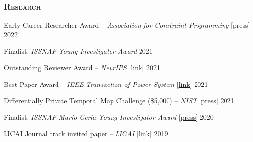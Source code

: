 


\subsubsection*{{\bf \scshape Research}}
\beginList
\item
	Early Career Researcher Award -- \emph{Association for Constraint Programming}
	[\href{https://www.a4cp.org/awards/early-career-research-award}{press}]
	\hfill 2022

\item 
	Finalist, {\em ISSNAF Young Investigator Award}	 
	\hfill 2021


\item 
	Outstanding Reviewer Award -- \emph{NeurIPS} 
	[\href{https://nips.cc/Conferences/2021/}{link}]
	\hfill 2021

\item
	Best Paper Award -- \emph{IEEE Transaction of Power System}
	[\href{https://ieeexplore.ieee.org/stamp/stamp.jsp?tp=&arnumber=9358108}{link}]
	\hfill 2021

\item 
	Differentially Private Temporal Map Challenge (\$5,000) -- \emph{NIST} 
	[\href{https://www.drivendata.co/blog/differential-privacy-winners-sprint1/}{press}] 
	\hfill 2021

\item 
	Finalist, {\em ISSNAF Mario Gerla Young Investigator Award}	 
	[\href{https://ambwashingtondc.esteri.it/ambasciata\_washington/en/sala-stampa/dall\_ambasciata/2020/11/lotta-al-covid-leucemie-ai-nuovi.html}{press}]
	\hfill 2020

\item 
	IJCAI Journal track invited paper -- \emph{IJCAI} 
	[\href{https://ijcai20.org/}{link}]
	\hfill 2019

